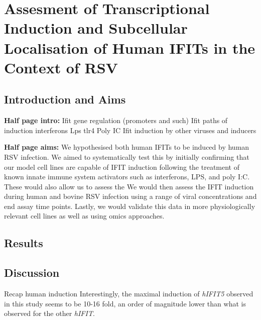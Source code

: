\chapter{Assesment of Transcriptional Induction and Subcellular Localisation of Human IFITs in the Context of RSV} \label{ch:Assesment of Transcriptional Induction of Human IFITs in the Context of RSV}
\section{Introduction and Aims} \label{sec:Introduction and Aims-Chapter 1}
\textbf{Half page intro:}
Ifit gene regulation (promoters and such) \newline
Ifit paths of induction \newline
interferons \newline
Lps tlr4 \newline
Poly IC \newline
Ifit induction by other viruses and inducers \newline

\lipsum[1-2]


\textbf{Half page aims:}
We hypothesised both human IFITs to be induced by human RSV infection. We aimed to systematically test this by initially confirming that our model cell lines are capable of IFIT induction following the treatment of known innate immune system activators such as interferons, LPS, and poly I:C. These would also allow us to assess the  We would then assess the IFIT induction during human and bovine RSV infection using a range of viral concentrations and end assay time points. Lastly, we would validate this data in more physiologically relevant cell lines as well as using omics approaches.

\lipsum[1]
\section{Results} \label{sec:Results-Chapter 1}



\section{Discussion} \label{sec:Discussion Chapter 1}
Recap human induction \newline
Interestingly, the maximal induction of \textit{hIFIT5} observed in this study seems to be 10-16 fold, an order of magnitude lower than what is observed for the other \textit{hIFIT}.


\lipsum[1-6]


